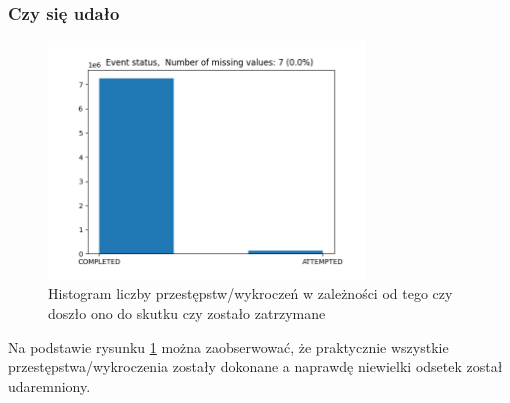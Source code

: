 \documentclass{classrep}
\begin{document}
{{            \subsubsection{Czy się udało} {
                \begin{figure}[!htbp]
                    \centering
                    \includegraphics[width=0.75\textwidth]{img/Eventstatus-133630.png}
                    \caption{Histogram liczby przestępstw/wykroczeń w zależności od tego czy doszło ono do skutku czy zostało zatrzymane}
                    \label{hist_is_completed}
                \end{figure}
                \FloatBarrier
                Na podstawie rysunku \ref{hist_is_completed} można zaobserwować, że
                praktycznie wszystkie przestępstwa/wykroczenia zostały dokonane a
                naprawdę niewielki odsetek został udaremniony.
            }

}}
\end{document}
